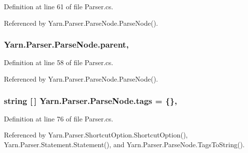 Definition at line 61 of file Parser.\-cs.



Referenced by Yarn.\-Parser.\-Parse\-Node.\-Parse\-Node().

\hypertarget{a00142_af313a82103fcc2ff5a177dbb06b92f7b}{
\subsubsection[{parent}]{ Yarn.\-Parser.\-Parse\-Node.\-parent\hspace{0.3cm}{\ttfamily [package]}, {\ttfamily [inherited]}}}\label{a00142_af313a82103fcc2ff5a177dbb06b92f7b}


Definition at line 58 of file Parser.\-cs.



Referenced by Yarn.\-Parser.\-Parse\-Node.\-Parse\-Node().

\hypertarget{a00142_a58b3a15788fd2d4127d73619dc6d04ae}{
\subsubsection[{tags}]{\setlength{\rightskip}{0pt plus 5cm}string \mbox{[}$\,$\mbox{]} Yarn.\-Parser.\-Parse\-Node.\-tags = \{\}\hspace{0.3cm}{\ttfamily [package]}, {\ttfamily [inherited]}}}\label{a00142_a58b3a15788fd2d4127d73619dc6d04ae}


Definition at line 76 of file Parser.\-cs.



Referenced by Yarn.\-Parser.\-Shortcut\-Option.\-Shortcut\-Option(), Yarn.\-Parser.\-Statement.\-Statement(), and Yarn.\-Parser.\-Parse\-Node.\-Tags\-To\-String().

